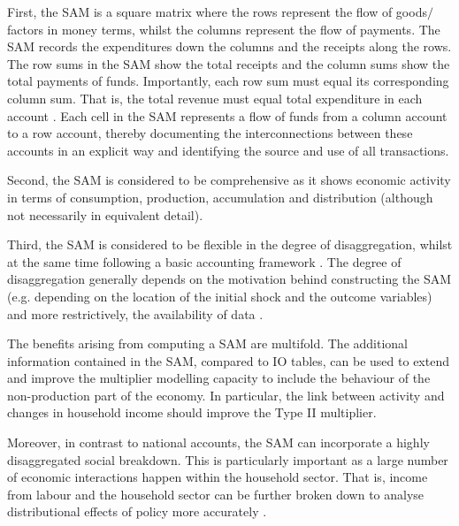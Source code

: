 \bigskip

First, the SAM is a square matrix where the rows represent the flow of goods$/$factors in money terms, whilst the columns represent the flow of payments. The SAM records the expenditures down the columns and the receipts along the rows. The row sums in the SAM show the total receipts and the column sums show the total payments of funds. Importantly, each row sum must equal its corresponding column sum. That is, the total revenue must equal total expenditure in each account . Each cell in the SAM represents a flow of funds from a column account to a row account, thereby documenting the interconnections between these accounts in an explicit way and identifying the source and use of all transactions. 

\bigskip

Second, the SAM is considered to be comprehensive as it shows economic activity in terms of consumption, production, accumulation and distribution (although not necessarily in equivalent detail). 

\bigskip

Third, the SAM is considered to be flexible in the degree of disaggregation, whilst at the same time following a basic accounting framework . The degree of disaggregation generally depends on the motivation behind constructing the SAM (e.g. depending on the location of the initial shock and the outcome variables) and more restrictively, the availability of data \cite{Round2003a}. 

\bigskip

The benefits arising from computing a SAM are multifold. The additional information contained in the SAM, compared to IO tables, can be used to extend and improve the multiplier modelling capacity to include the behaviour of the non-production part of the economy. In particular, the link between activity and changes in household income should improve the Type II multiplier. 

\newpage

Moreover, in contrast to national accounts, the SAM can incorporate a highly disaggregated social breakdown. This is particularly important as a large number of economic interactions happen within the household sector. That is, income from labour and the household sector can be further broken down to analyse distributional effects of policy more accurately \cite{Stuttard2003b}. 

\bigskip

